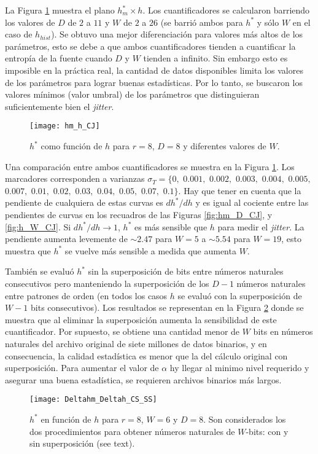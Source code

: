 La Figura \ref{fig:hm_h_CJ} muestra el plano $h^*_{m} \times h$.
Los cuantificadores se calcularon barriendo los valores de $D$ de $2$ a $11$ y $W$ de $2$ a $26$ (se barrió ambos para $h^*$ y sólo $W$ en el caso de $h_{hist}$).
Se obtuvo una mejor diferenciación para valores más altos de los parámetros, esto se debe a que ambos cuantificadores tienden a cuantificar la entropía de la fuente cuando $D$ y $W$ tienden a infinito.
Sin embargo esto es imposible en la práctica real, la cantidad de datos disponibles limita los valores de los parámetros para lograr buenas estadísticas.
Por lo tanto, se buscaron los valores mínimos (valor umbral) de los parámetros que distinguieran suficientemente bien el \textit{jitter}.
%
\begin{figure}
	\centering
	\texttt{[image: hm\_h\_CJ]}
	\caption{$h^*$ como función de $h$ para $r=8$, $D=8$ y diferentes valores de $W$.}
	\label{fig:hm_h_CJ}
\end{figure}

Una comparación entre ambos cuantificadores se muestra en la Figura \ref{fig:hm_h_CJ}.
Los marcadores corresponden a varianzas $\sigma_T=\{0,$ $0.001,$ $0.002,$ $0.003,$ $0.004,$ $0.005,$ $0.007,$ $0.01,$ $0.02,$ $0.03,$ $0.04,$ $0.05,$ $0.07,$ $0.1\}$.
Hay que tener en cuenta que la pendiente de cualquiera de estas curvas es $dh^*/dh$ y es igual al cociente entre las pendientes de curvas en los recuadros de las Figuras \ref{fig:hm_D_CJ}, y \ref{fig:h_W_CJ}.
Si $dh^*/dh\to1$, $h^*$ es más sensible que $h$ para medir el \textit{jitter}.
La pendiente aumenta levemente de $\sim2.47$ para $W =5 $ a $\sim5.54$ para $W = 19$, esto muestra que $h^*$ se vuelve más sensible a medida que aumenta $W$.

También se evaluó $h^*$ sin la superposición de bits entre números naturales consecutivos pero manteniendo la superposición de los $D-1$ números naturales entre patrones de orden (en todos los casos $h$ se evaluó con la superposición de $W-1$ bits consecutivos).
Los resultados se representan en la Figura \ref{fig:Deltahm_Deltah_CS_SS} donde se muestra que al eliminar la superposición aumenta la sensibilidad de este cuantificador.
Por supuesto, se obtiene una cantidad menor de $W$ bits en números naturales del archivo original de siete millones de datos binarios, y en consecuencia, la calidad estadística es menor que la del cálculo original con superposición.
Para aumentar el valor de $\alpha$ hy llegar al minimo nivel requerido y asegurar una buena estadística, se requieren archivos binarios más largos.
%
\begin{figure}
\centering
\texttt{[image: Deltahm\_Deltah\_CS\_SS]}
\caption{$h^*$ en función de $h$ para $r=8$, $W=6$ y $D=8$. Son considerados los dos procedimientos para obtener números naturales de $W$-bits: con y sin superposición (see text).}
\label{fig:Deltahm_Deltah_CS_SS}
\end{figure}

